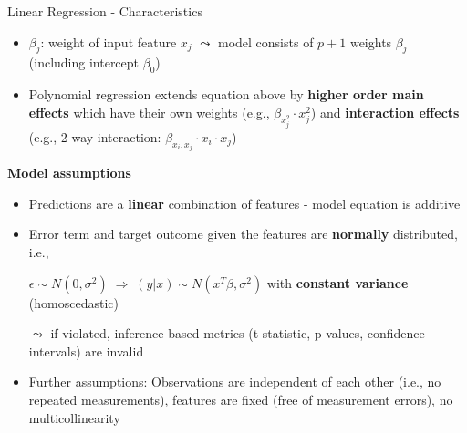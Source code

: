 \documentclass[11pt,compress,t,notes=noshow, aspectratio=169, xcolor=table]{beamer}
\begin{document}
\begin{frame}[c]{Linear Regression - Characteristics}
    \begin{itemize}
        \item $\beta_j$: weight of input feature $x_j$ $\leadsto$ model consists of $p+1$ weights $\beta_j$ (including intercept $\beta_0$)
        \item Polynomial regression extends equation above by \textbf{higher order main effects} which have their own weights (e.g., $\beta_{x_j^2} \cdot x_j^2$) and \textbf{interaction effects} (e.g., 2-way interaction: $\beta_{x_i, x_j} \cdot x_i \cdot x_j$)
    \end{itemize}
   \vspace*{0.2cm} 
   \pause
    \textbf{Model assumptions}
    \begin{itemize}
    \item Predictions are a \textbf{linear} combination of features - model equation is additive%
    \item Error term and target outcome given the features are \textbf{normally} distributed, i.e.,\\
    \centerline{$\epsilon \sim N(0, \sigma^2) \; \Rightarrow \; (y \vert x) \sim N(x^T \beta, \sigma^2)$ with \textbf{constant variance} (homoscedastic)}
    $\leadsto$ if violated, inference-based metrics (t-statistic, p-values, confidence intervals) are invalid
    \item Further assumptions: Observations are independent of each other (i.e., no repeated measurements), features are fixed (free of measurement errors), no multicollinearity

\end{itemize}
\end{frame}
\end{document}
